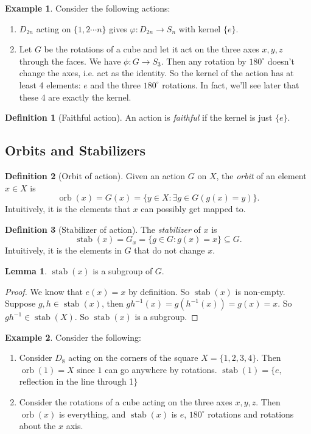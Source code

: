 \documentclass[a4paper]{article}
\theoremstyle{definition}
\newtheorem*{defi}{Definition}
\newtheorem*{eg}{Example}
\newtheorem*{lemma}{Lemma}
\DeclareMathOperator\orb{orb}
\DeclareMathOperator\stab{stab}
\begin{document}
\begin{eg}
  Consider the following actions:
  \begin{enumerate}
  \item $D_{2n}$ acting on $\{1, 2\cdots n\}$ gives $\varphi: D_{2n}\to S_n$ with kernel $\{e\}$.
  \item Let $G$ be the rotations of a cube and let it act on the three axes $x, y, z$ through the faces. We have $\phi: G\to S_3$. Then any rotation by $180^\circ$ doesn't change the axes, i.e. act as the identity. So the kernel of the action has at least 4 elements: $e$ and the three $180^\circ$ rotations. In fact, we'll see later that these 4 are exactly the kernel.
  \end{enumerate}
\end{eg}

\begin{defi}[Faithful action]
  An action is \emph{faithful} if the kernel is just $\{e\}$.
\end{defi}

\subsection{Orbits and Stabilizers}
\begin{defi}[Orbit of action]
  Given an action $G$ on $X$, the \emph{orbit} of an element $x\in X$ is 
  \[
  \orb (x) = G(x) = \{y\in X: \exists g\in G(g(x) = y)\}.
  \]
  Intuitively, it is the elements that $x$ can possibly get mapped to.
\end{defi}
\begin{defi}[Stabilizer of action]
  The \emph{stabilizer} of $x$ is
  \[
  \stab(x) = G_x = \{g\in G: g(x) = x\}\subseteq G.
  \]
  Intuitively, it is the elements in $G$ that do not change $x$.
\end{defi}

\begin{lemma}
  $\stab(x)$ is a subgroup of $G$.
\end{lemma}

\begin{proof}
  We know that $e(x) = x$ by definition. So $\stab(x)$ is non-empty. Suppose $g, h\in \stab(x)$, then $gh^{-1}(x) = g(h^{-1}(x)) = g(x) = x$. So $gh^{-1}\in \stab (X)$. So $\stab (x)$ is a subgroup.
\end{proof}

\begin{eg}
  Consider the following:
  \begin{enumerate}
  \item Consider $D_8$ acting on the corners of the square $X = \{1, 2, 3, 4\}$. Then $\orb(1) = X$ since $1$ can go anywhere by rotations. $\stab(1) = \{e, $ reflection in the line through 1$\}$
  \item Consider the rotations of a cube acting on the three axes $x, y, z$. Then $\orb(x)$ is everything, and $\stab(x)$ is $e$, $180^\circ$ rotations and rotations about the $x$ axis.
  \end{enumerate}
\end{eg}
\end{document}

